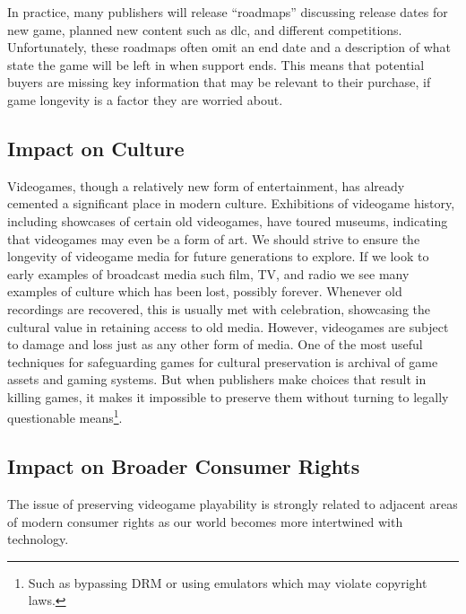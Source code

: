 In practice, many publishers will release ``roadmaps'' discussing release dates for new game, planned new content such as \gls{dlc}, and different competitions.
Unfortunately, these roadmaps often omit an end date and a description of what state the game will be left in when support ends.
This means that potential buyers are missing key information that may be relevant to their purchase, if game longevity is a factor they are worried about.

\subsection{Impact on Culture}
Videogames, though a relatively new form of entertainment, has already cemented a significant place in modern culture.
Exhibitions of videogame history, including showcases of certain old videogames, have toured museums, indicating that videogames may even be a form of art.
We should strive to ensure the longevity of videogame media for future generations to explore.
If we look to early examples of broadcast media such film, TV, and radio we see many examples of culture which has been lost, possibly forever\cn.
Whenever old recordings are recovered, this is usually met with celebration\cn, showcasing the cultural value in retaining access to old media.
However, videogames are subject to damage and loss just as any other form of media.
One of the most useful techniques for safeguarding games for cultural preservation is archival of game \glspl{asset} and gaming systems.
But when publishers make choices that result in killing games, it makes it impossible to preserve them without turning to legally questionable means\footnote{
    Such as bypassing DRM or using emulators which may violate copyright laws.
}.


\subsection{Impact on Broader Consumer Rights}
The issue of preserving videogame playability is strongly related to adjacent areas of modern consumer rights as our world becomes more intertwined with technology.

